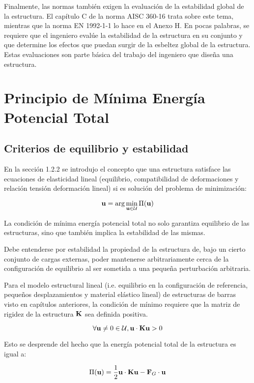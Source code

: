 Finalmente, las normas también exigen la evaluación de la estabilidad global de la estructura. El capítulo C de la norma AISC 360-16 trata sobre este tema, mientras que la norma EN 1992-1-1 lo hace en el Anexo H. En pocas palabras, se requiere que el ingeniero evalúe la estabilidad de la estructura en su conjunto y que determine los efectos que puedan surgir de la esbeltez global de la estructura. Estas evaluaciones son parte básica del trabajo del ingeniero que diseña una estructura.


\section{Principio de Mínima Energía Potencial Total}

\subsection{Criterios de equilibrio y estabilidad} 
En la sección 1.2.2 se introdujo el concepto que una estructura satisface las ecuaciones de elasticidad lineal (equilibrio, compatibilidad de deformaciones y relación tensión deformación lineal) si es solución del problema de minimización:

\begin{equation*}
{\bf u} = \arg\min_{{\bf u}\in{\mathcal U}} \Pi({\bf u})
\end{equation*}

La condición de mínima energía potencial total no solo garantiza equilibrio de las estructuras, sino que también implica la estabilidad de las mismas.

Debe entenderse por estabilidad la propiedad de la estructura de, bajo un cierto conjunto de cargas externas, poder mantenerse arbitrariamente cerca de la configuración de equilibrio al ser sometida a una pequeña perturbación arbitraria.

Para el modelo estructural lineal (i.e. equilibrio en la configuración de referencia, pequeños desplazamientos y material elástico lineal) de estructuras de barras visto en capítulos anteriores, la condición de mínimo requiere que la matriz de rigidez de la estructura ${\bf K}$ sea definida positiva.

$$\forall {\bf u}\neq 0 \in {\mathcal U}, {\bf u} \cdot {\bf K} {\bf u} > 0$$

Esto se desprende del hecho que la energía potencial total de la estructura es igual a:

$$\Pi({\bf u})= \frac{1}{2} {\bf u} \cdot {\bf K} {\bf u} - {\bf F}_G \cdot {\bf u}$$

